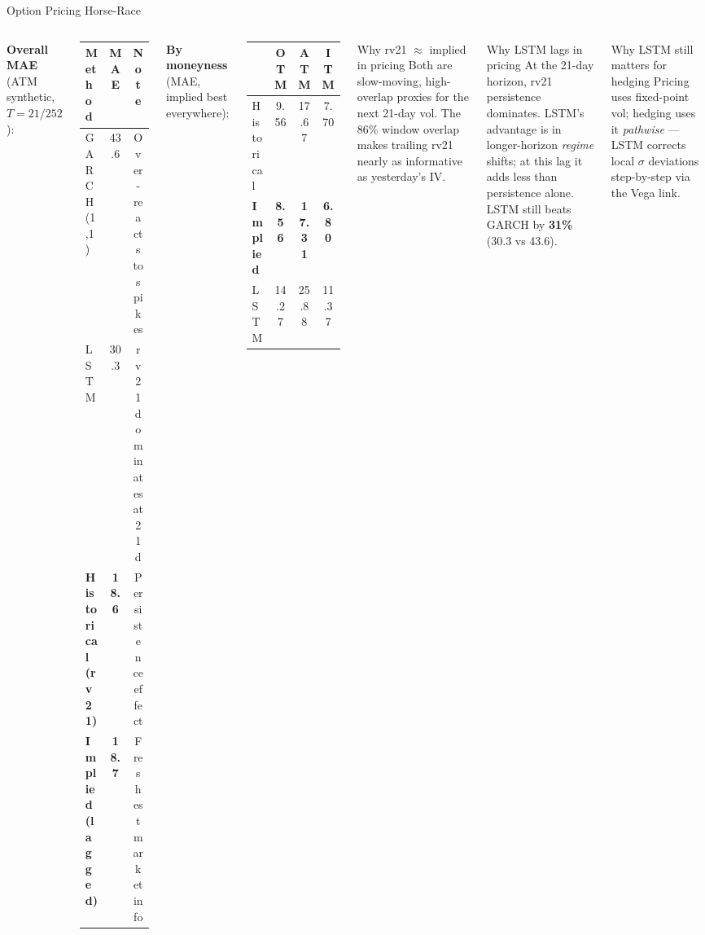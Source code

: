 \documentclass[aspectratio=169,10pt]{beamer}
\newcommand{\best}[1]{\cellcolor{teal!18}\textbf{#1}}
\begin{document}
\begin{frame}{Option Pricing Horse-Race}
\begin{columns}[T]
\textbf{Overall MAE} (ATM synthetic, $T=21/252$):
\begin{center}
\small
\begin{tabular}{lcc}
\toprule
Method & MAE & Note \\
\midrule
GARCH(1,1)        & 43.6 & Over-reacts to spikes \\
LSTM              & 30.3 & rv21 dominates at 21d \\
\best{Historical (rv21)} & \best{18.6} & Persistence effect \\
\best{Implied (lagged)} & \best{18.7} & Freshest market info \\
\bottomrule
\end{tabular}
\end{center}

\medskip\small
\textbf{By moneyness} (MAE, implied best everywhere):
\begin{center}
\begin{tabular}{lccc}
\toprule
 & OTM & ATM & ITM \\
\midrule
Historical & 9.56 & 17.67 & 7.70 \\
\best{Implied} & \best{8.56} & \best{17.31} & \best{6.80} \\
LSTM & 14.27 & 25.88 & 11.37 \\
\bottomrule
\end{tabular}
\end{center}

\begin{block}{Why rv21 $\approx$ implied in pricing}
Both are slow-moving, high-overlap proxies for the next 21-day vol. The 86\% window overlap makes trailing rv21 nearly as informative as yesterday's IV.
\end{block}
\begin{alertblock}{Why LSTM lags in pricing}
At the 21-day horizon, rv21 persistence dominates. LSTM's advantage is in longer-horizon \emph{regime} shifts; at this lag it adds less than persistence alone.\\[0.3em]
LSTM still beats GARCH by \textbf{31\%} (30.3 vs 43.6).
\end{alertblock}
\begin{exampleblock}{Why LSTM still matters for hedging}
Pricing uses fixed-point vol; hedging uses it \emph{pathwise} — LSTM corrects local $\sigma$ deviations step-by-step via the Vega link.
\end{exampleblock}
\end{columns}
\end{frame}
\end{document}
